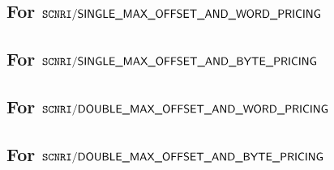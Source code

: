 \subsection{For $\texttt{SCNRI}\textsf{/}{\textsf{SINGLE\_MAX\_OFFSET\_AND\_WORD\_PRICING}}$}       \label{mxp: computation: single_max_offset_word}              
\subsection{For $\texttt{SCNRI}\textsf{/}{\textsf{SINGLE\_MAX\_OFFSET\_AND\_BYTE\_PRICING}}$}       \label{mxp: computation: single_max_offset_byte}                          
\subsection{For $\texttt{SCNRI}\textsf{/}{\textsf{DOUBLE\_MAX\_OFFSET\_AND\_WORD\_PRICING}}$}       \label{mxp: computation: double_max_offset_word}              
\subsection{For $\texttt{SCNRI}\textsf{/}{\textsf{DOUBLE\_MAX\_OFFSET\_AND\_BYTE\_PRICING}}$}       \label{mxp: computation: double_max_offset_byte}              
